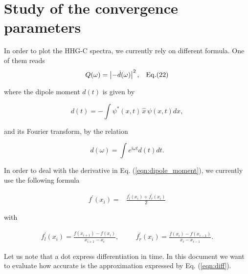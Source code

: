 \documentclass[10pt]{article}
\begin{document}
\section*{Study of the convergence parameters}


In order to plot the HHG-C spectra, 
we currently rely on different formula. One of them reads 
\begin{equation}
Q(\omega) = \left|-\dot{d}(\omega) \right|^2, \;\;\;{\rm Eq. (22)}\label{eqn:diff_dipole}
\end{equation}

\noindent where the dipole moment $d(t)$ is given by

\begin{equation}
d(t)= - \int \psi^*(x,t)\,\hat{x}\,\psi(x,t)dx, \label{eqn:dipole_moment}
\end{equation}

\noindent and its Fourier transform, by the relation

\begin{equation}
d(\omega) = \int e^{i\omega t} d(t)dt. \label{eqn:fourier}
\end{equation}

%

In order to deal with the derivative in Eq. (\ref{eqn:dipole_moment}),
we currently use the following formula


\begin{align}
f^{\prime} (x_i) = & \frac{f^{\prime}_l (x_i) + f^{\prime}_r (x_i)}{2}
\label{eqn:diff} 
\end{align}

\noindent with

\begin{align}
f^{\prime}_l (x_i) = \frac{f(x_{i+1}) -  f(x_i)}{x_{i+1} -x_i}, & \hspace{20pt}
f^{\prime}_r (x_i) = \frac{f(x_{i}) -  f(x_{i-1})}{x_{i} - x_{i-1}}. \nonumber
\end{align}

Let us note that a dot express differentiation in time.
In this document we want to evaluate how accurate is the approximation 
expressed by Eq. (\ref{eqn:diff}).



%
%
%
\end{document}
